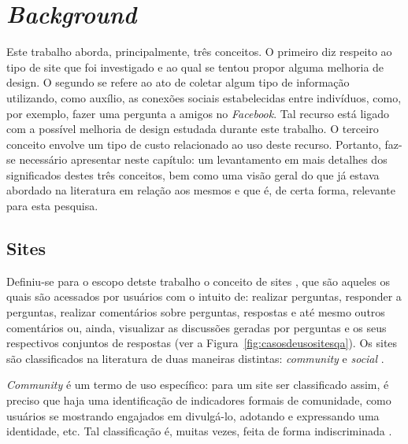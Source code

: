 \chapter{\textit{Background}}
Este trabalho aborda, principalmente, três conceitos. O primeiro diz respeito ao tipo de site que foi investigado e ao qual se tentou propor alguma melhoria de design. O segundo se refere ao ato de coletar algum tipo de informação utilizando, como auxílio, as conexões sociais estabelecidas entre indivíduos, como, por exemplo, fazer uma pergunta a amigos no \textit{Facebook}. Tal recurso está ligado com a possível melhoria de design estudada durante este trabalho. O terceiro conceito envolve um tipo de custo relacionado ao uso deste recurso. Portanto, faz-se necessário apresentar neste capítulo: um levantamento em mais detalhes dos significados destes três conceitos, bem como uma visão geral do que já estava abordado na literatura em relação aos mesmos e que é, de certa forma, relevante para esta pesquisa.

\section{Sites \qa}
Definiu-se para o escopo detste trabalho o conceito de sites \qanospace, que são aqueles os quais são acessados por usuários com o intuito de: realizar perguntas, responder a perguntas, realizar comentários sobre perguntas, respostas e até mesmo outros comentários ou, ainda, visualizar as discussões geradas por perguntas e os seus respectivos conjuntos de respostas (ver a Figura~\ref{fig:casosdeusositesqa}). Os sites \qa são classificados na literatura de duas maneiras distintas: \textit{community} \qa e \textit{social} \qa \cite{gazan2011social}.

\textit{Community} \qa é um termo de uso específico: para um site ser classificado assim, é preciso que haja uma identificação de indicadores formais de comunidade, como usuários se mostrando engajados em divulgá-lo, adotando e expressando uma identidade, etc. \cite{kling2005understanding} Tal classificação é, muitas vezes, feita de forma indiscriminada \cite{rosenbaum2010structuration}.

